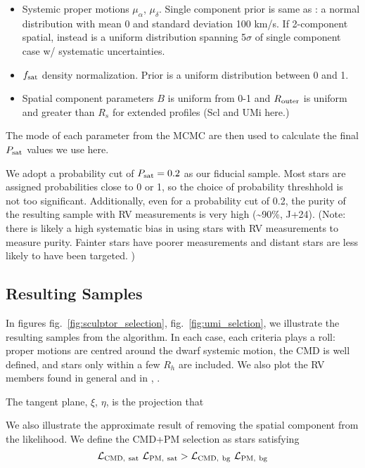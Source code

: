 \begin{itemize}
\tightlist
\item
  Systemic proper motions \(\mu_\alpha\), \(\mu_\delta\). Single
  component prior is same as \citet{MV2020}: a normal distribution with
  mean 0 and standard deviation 100 km/s. If 2-component spatial,
  instead is a uniform distribution spanning 5\(\sigma\) of single
  component case w/ systematic uncertainties.
\item
  \(f_{\rm sat}\) density normalization. Prior is a uniform distribution
  between 0 and 1.
\item
  Spatial component parameters \(B\) is uniform from 0-1 and
  \(R_{\rm outer}\) is uniform and greater than \(R_s\) for extended
  profiles (Scl and UMi here.)
\end{itemize}

The mode of each parameter from the MCMC are then used to calculate the
final \(P_{\rm sat}\) values we use here.

We adopt a probability cut of \(P_{\rm sat} = 0.2\) as our fiducial
sample. Most stars are assigned probabilities close to 0 or 1, so the
choice of probability threshhold is not too significant. Additionally,
even for a probability cut of 0.2, the purity of the resulting sample
with RV measurements is very high (\textasciitilde90\%, J+24). (Note:
there is likely a high systematic bias in using stars with RV
measurements to measure purity. Fainter stars have poorer measurements
and distant stars are less likely to have been targeted. )

\subsection{Resulting Samples}\label{resulting-samples}

In figures fig.~\ref{fig:sculptor_selection},
fig.~\ref{fig:umi_selction}, we illustrate the resulting samples from
the algorithm. In each case, each criteria plays a roll: proper motions
are centred around the dwarf systemic motion, the CMD is well defined,
and stars only within a few \(R_h\) are included. We also plot the RV
members found in general and in \citet{sestito+2024},
\citet{sestito+2024b}.

The tangent plane, \(\xi\), \(\eta\), is the projection that

We also illustrate the approximate result of removing the spatial
component from the likelihood. We define the CMD+PM selection as stars
satisfying \[
{\cal L}_{\rm CMD,\ sat}\ {\cal L}_{\rm PM,\ sat} > {\cal L}_{\rm CMD,\ bg}\ {\cal L}_{\rm PM,\ bg}
\]

